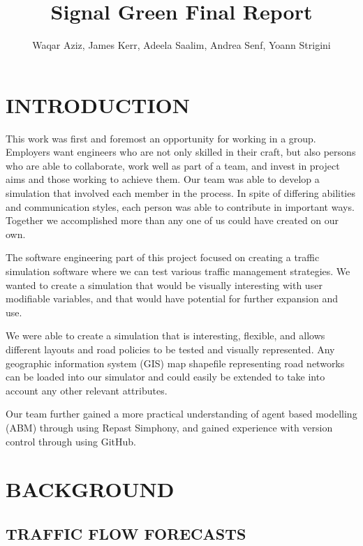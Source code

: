 \documentclass[11pt]{article}
\begin{document}
\title{Signal Green Final Report}

\author{Waqar Aziz, James Kerr, Adeela Saalim, Andrea Senf, Yoann Strigini}

\maketitle 

\listoftables

\section{INTRODUCTION}


This work was first and foremost an opportunity for working in a group. Employers want engineers who are not only skilled in their craft, but also persons who are able to collaborate, work well as part of a team, and invest in project aims and those working to achieve them. Our team was able to develop a simulation that involved each member in the process. In spite of differing abilities and communication styles, each person was able to contribute in important ways. Together we accomplished more than any one of us could have created on our own.

The software engineering part of this project focused on creating a traffic simulation software where we can test various traffic management strategies. We wanted to create a simulation that would be visually interesting with user modifiable variables, and that would have potential for further expansion and use.

We were able to create a simulation that is interesting, flexible, and allows different layouts and road policies to be tested and visually represented. Any geographic information system (GIS) map shapefile representing road networks can be loaded into our simulator and could easily be extended to take into account any other relevant attributes.

Our team further gained a more practical understanding of agent based modelling (ABM) through using Repast Simphony, and gained experience with version control through using GitHub.



\section{BACKGROUND}

\subsection{TRAFFIC FLOW FORECASTS}
\end{document}
